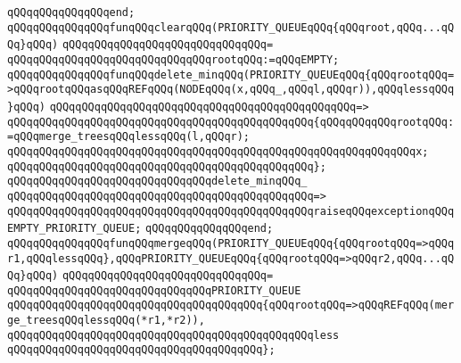 \verb|qQQqqQQqqQQqqQQqend;|\newline
\newline
\newline
\verb|qQQqqQQqqQQqqQQqfunqQQqclearqQQq(PRIORITY_QUEUEqQQq{qQQqroot,qQQq...qQQq}qQQq)|\newline
\verb|qQQqqQQqqQQqqQQqqQQqqQQqqQQqqQQq=|\newline
\verb|qQQqqQQqqQQqqQQqqQQqqQQqqQQqqQQqrootqQQq:=qQQqEMPTY;|\newline
\newline
\newline
\verb|qQQqqQQqqQQqqQQqfunqQQqdelete_minqQQq(PRIORITY_QUEUEqQQq{qQQqrootqQQq=>qQQqrootqQQqasqQQqREFqQQq(NODEqQQq(x,qQQq_,qQQql,qQQqr)),qQQqlessqQQq}qQQq)|\newline
\verb|qQQqqQQqqQQqqQQqqQQqqQQqqQQqqQQqqQQqqQQqqQQqqQQq=>|\newline
\verb|qQQqqQQqqQQqqQQqqQQqqQQqqQQqqQQqqQQqqQQqqQQqqQQq{qQQqqQQqqQQqrootqQQq:=qQQqmerge_treesqQQqlessqQQq(l,qQQqr);|\newline
\verb|qQQqqQQqqQQqqQQqqQQqqQQqqQQqqQQqqQQqqQQqqQQqqQQqqQQqqQQqqQQqqQQqx;|\newline
\verb|qQQqqQQqqQQqqQQqqQQqqQQqqQQqqQQqqQQqqQQqqQQqqQQq};|\newline
\newline
\verb|qQQqqQQqqQQqqQQqqQQqqQQqqQQqqQQqdelete_minqQQq_|\newline
\verb|qQQqqQQqqQQqqQQqqQQqqQQqqQQqqQQqqQQqqQQqqQQqqQQq=>|\newline
\verb|qQQqqQQqqQQqqQQqqQQqqQQqqQQqqQQqqQQqqQQqqQQqqQQqraiseqQQqexceptionqQQqEMPTY_PRIORITY_QUEUE;|\newline
\verb|qQQqqQQqqQQqqQQqend;|\newline
\newline
\newline
\verb|qQQqqQQqqQQqqQQqfunqQQqmergeqQQq(PRIORITY_QUEUEqQQq{qQQqrootqQQq=>qQQqr1,qQQqlessqQQq},qQQqPRIORITY_QUEUEqQQq{qQQqrootqQQq=>qQQqr2,qQQq...qQQq}qQQq)|\newline
\verb|qQQqqQQqqQQqqQQqqQQqqQQqqQQqqQQq=|\newline
\verb|qQQqqQQqqQQqqQQqqQQqqQQqqQQqqQQqPRIORITY_QUEUE|\newline
\verb|qQQqqQQqqQQqqQQqqQQqqQQqqQQqqQQqqQQqqQQq{qQQqrootqQQq=>qQQqREFqQQq(merge_treesqQQqlessqQQq(*r1,*r2)),|\newline
\verb|qQQqqQQqqQQqqQQqqQQqqQQqqQQqqQQqqQQqqQQqqQQqqQQqless|\newline
\verb|qQQqqQQqqQQqqQQqqQQqqQQqqQQqqQQqqQQqqQQq};|\newline
